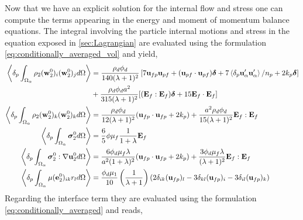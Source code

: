 Now that we have an explicit solution for the internal flow and stress one can compute the terms appearing in the energy and moment of momentum balance equations. 
The integral involving the particle internal motions and stress in the equation exposed in \ref{sec:Lagrangian} are evaluated using the formulation \ref{eq:conditionally_averaged_vol} and yield, 
\begin{align*}
    \left<\delta_p \int_{\Omega_{\alpha}} \rho_2(\textbf{w}_2^0)_i (\textbf{w}_2^0)_j d\Omega\right>
    &= \frac{\rho_d \phi_d}{140(\lambda +1 )^2}
    \left[
        7\textbf{u}_{fp}\textbf{u}_{pf} 
    + (\textbf{u}_{pf}\cdot \textbf{u}_{pf})\bm\delta
    + 7\left<\delta_p \textbf{u}_\alpha'\textbf{u}_\alpha'\right>/n_p 
    + 2k_p \bm\delta
    \right]\\
    &+ \frac{\rho_d \phi_d a^2}{315 (\lambda + 1)^2}[(\textbf{E}_f : \textbf{E}_f)\bm\delta+15\textbf{E}_f\cdot \textbf{E}_f]
\\
    \left<\delta_p \int_{\Omega_{\alpha}} \rho_2(\textbf{w}_2^0)_k (\textbf{w}_2^0)_k d\Omega\right>
    &=  \frac{\rho_d \phi_d}{12 (\lambda +1)^2}
    (\textbf{u}_{fp} \cdot \textbf{u}_{fp} + 2 k_p)
    + \frac{a^2 \rho_d \phi_d}{15(\lambda+1)^2}
    \textbf{E}_f:\textbf{E}_f    \\
    \left<\delta_p \int_{\Omega_{\alpha}} \bm\sigma_2^0 d\Omega\right>
    &= \frac{6}{5}\phi \mu_f \frac{1}{1+\lambda} \textbf{E}_f
\\
    \left<\delta_p \int_{\Omega_{\alpha}} \bm{\sigma}_2^0:\mathbf{\nabla} \textbf{u}_2^0 d\Omega\right>
    &= 
    \frac{6 \phi_d \mu_f \lambda}{a^2(1+\lambda)^2}
    (\textbf{u}_{fp}\cdot \textbf{u}_{fp} + 2k_p)
    + \frac{3 \phi_d \mu_f \lambda}{(\lambda+1)^2}\textbf{E}_f:\textbf{E}_f
\\
    \left<\delta_p \int_{\Omega_{\alpha}} \mu(\textbf{e}_2^0)_{ik} r_l d\Omega\right> &=
    \frac{\phi_d\mu_1}{10}\left(\frac{1}{\lambda+1}\right)
    \left(
        2\delta_{ik}(\textbf{u}_{fp})_l
        -3\delta_{kl}(\textbf{u}_{fp})_i
        -3\delta_{il}(\textbf{u}_{fp})_k
    \right)
\end{align*}
Regarding the interface term they are evaluated using the formulation \ref{eq:conditionally_averaged} and reads, 
